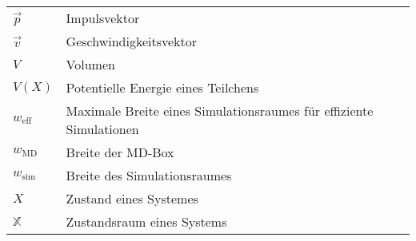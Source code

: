 \begin{longtable}{ll}
$\vec p$             & Impulsvektor                                                        \\
$\vec v$             & Geschwindigkeitsvektor                                              \\
$V$                  & Volumen                                                             \\
$V(X)$               & Potentielle Energie eines Teilchens                                 \\
$w_\text{eff}$       & Maximale Breite eines Simulationsraumes für effiziente Simulationen \\
$w_\text{MD}$        & Breite der MD-Box                                                   \\
$w_\text{sim}$       & Breite des Simulationsraumes                                        \\
$X$                  & Zustand eines Systemes                                              \\
$\mathbb{X}$         & Zustandsraum eines Systems                                          \\
\end{longtable}

